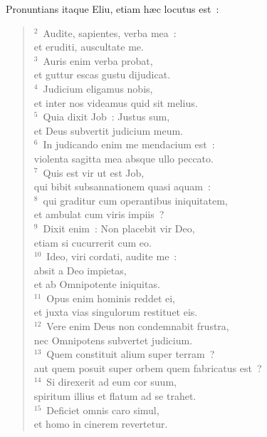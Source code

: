 \lettrine[lines=10,image=true,loversize=0.05,lraise=-0.03]{P}{}ronuntians itaque Eliu, etiam h\ae c locutus est~:
\begin{flushleft}\begin{verse}\vspace{6pt}${}^{2}$~Audite, sapientes, verba mea~:\\ et eruditi, auscultate me.\\
${}^{3}$~Auris enim verba probat,\\ et guttur escas gustu dijudicat.\\
${}^{4}$~Judicium eligamus nobis,\\ et inter nos videamus quid sit melius.\\
${}^{5}$~Quia dixit Job~: Justus sum,\\ et Deus subvertit judicium meum.\\
${}^{6}$~In judicando enim me mendacium est~:\\ violenta sagitta mea absque ullo peccato.\\
${}^{7}$~Quis est vir ut est Job,\\ qui bibit subsannationem quasi aquam~:\\
${}^{8}$~qui graditur cum operantibus iniquitatem,\\ et ambulat cum viris impiis~?\\
${}^{9}$~Dixit enim~: Non placebit vir Deo,\\ etiam si cucurrerit cum eo.\\
${}^{10}$~Ideo, viri cordati, audite me~:\\ absit a Deo impietas,\\ et ab Omnipotente iniquitas.\\
${}^{11}$~Opus enim hominis reddet ei,\\ et juxta vias singulorum restituet eis.\\
${}^{12}$~Vere enim Deus non condemnabit frustra,\\ nec Omnipotens subvertet judicium.\\
${}^{13}$~Quem constituit alium super terram~?\\ aut quem posuit super orbem quem fabricatus est~?\\
${}^{14}$~Si direxerit ad eum cor suum,\\ spiritum illius et flatum ad se trahet.\\
${}^{15}$~Deficiet omnis caro simul,\\ et homo in cinerem revertetur.\\

\end{verse}
\end{flushleft}

